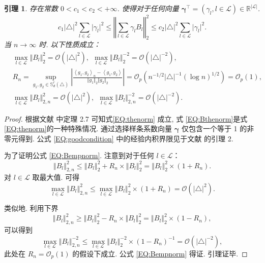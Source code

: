 \documentclass[a4paper,openay,14pt]{ctexbook}
\newtheorem{lem}{引理}
\numberwithin{equation}{section}
\numberwithin{lem}{section}
\begin{document}
\begin{lem}\label{Lemma:BProperty}
    存在常数 $0<c_1<c_2<+\infty$. 使得对于任何向量 $\bm{\gamma}^{\top} = (\gamma_l,l\in\mathcal{L})\in \mathbb{R}^{\vert\mathcal{L}\vert}$.
    \begin{equation}\label{EQ:thenorm}
    c_1\vert\triangle\vert^2\sum_{l\in\mathcal{L}}\vert\gamma_l\vert^2 \leq \left\Vert \sum_{l\in\mathcal{L}}\gamma_lB_l\right\Vert^2_2\leq c_2\vert\triangle\vert^2\sum_{l\in\mathcal{L}}\vert\gamma_l\vert^2.
    \end{equation}
    当 $n\to\infty$ 时. 以下性质成立：
    \begin{align}
        &\max_{l\in\mathcal{L}}\Vert B_l\Vert_2^2 = \mathcal{O}\left(\vert\triangle\vert^2\right),~ ~\max_{l\in\mathcal{L}}\Vert B_l\Vert_2^{-2} = \mathcal{O}\left(\vert\triangle\vert^{-2}\right),\label{EQ:Bthenorm}\\
        &R_n = \sup_{g_1,g_2\in \mathbb{S}_{d}^{r}(\triangle)}\left\vert\frac{\left<g_1,g_2\right>_{n}-\left<g_1,g_2\right>}{\Vert g_1\Vert_2\Vert g_2\Vert_2}\right\vert = \mathcal{O}_p\left( n^{-1/2}\vert\triangle\vert^{-1}\left(\log n\right)^{1/2}\right) = {\scriptstyle{\mathcal{O}}_{p}}(1),\label{EQ:goodcondition}\\
        &\max_{l\in\mathcal{L}}\Vert B_l\Vert_{2,n}^2 = \mathcal{O}(\vert\triangle\vert^2), ~ ~ \max_{l\in\mathcal{L}}\Vert B_l\Vert_{2,n}^{-2} = \mathcal{O}(\vert\triangle\vert^{-2}) \label{EQ:Bempnorm}.
    \end{align}    
\end{lem}
\begin{proof}
根据文献\cite{lai2007spline} 中定理 2.7 可知式\eqref{EQ:thenorm} 成立, 式 \eqref{EQ:Bthenorm}是式\eqref{EQ:thenorm}的一种特殊情况. 通过选择样条系数向量 $\bm{\gamma}$ 仅包含一个等于 1 的非零元得到. 公式 \eqref{EQ:goodcondition} 中的经验内积界限见于文献\cite{lai2013bivariate} 的引理 2.

为了证明公式 \eqref{EQ:Bempnorm}. 注意到对于任何 $l \in \mathcal{L}$：
\[
\left\Vert B_l \right\Vert_{2,n}^2 
\leq \left\Vert B_l \right\Vert_2^2 + R_n \times \left\Vert B_l \right\Vert_2^2 
= \left\Vert B_l \right\Vert_2^2 \times (1 + R_n).
\]
对 $l \in \mathcal{L}$ 取最大值. 可得
\[
\max_{l \in \mathcal{L}} \left\Vert B_l \right\Vert_{2,n}^2 
\leq \max_{l \in \mathcal{L}} \left\Vert B_l \right\Vert_2^2 \times (1 + R_n) 
= \mathcal{O}(|\triangle|^2).
\]

类似地. 利用下界
\[
\left\Vert B_l \right\Vert_{2,n}^2 
\geq \left\Vert B_l \right\Vert_2^2 - R_n \times \left\Vert B_l \right\Vert_2^2 
= \left\Vert B_l \right\Vert_2^2 \times (1 - R_n),
\]
可以得到
\[
\max_{l \in \mathcal{L}} \left\Vert B_l \right\Vert_{2,n}^{-2} 
\leq \max_{l \in \mathcal{L}} \left\Vert B_l \right\Vert_2^{-2} \times (1 - R_n)^{-1} 
= \mathcal{O}(|\triangle|^{-2}),
\]
此处在 $R_n = {\scriptstyle{\mathcal{O}}_{p}}(1)$ 的假设下成立. 公式 \eqref{EQ:Bempnorm} 得证. 引理证毕.
\end{proof}
\end{document}
